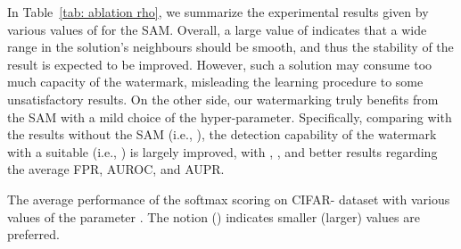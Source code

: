 \documentclass{article}
\begin{document}
In Table~\ref{tab: ablation rho}, we summarize the experimental results given by various values of  for the SAM. Overall, a large value of  indicates that a wide range in the solution's neighbours should be smooth, and thus the stability of the result is expected to be improved. However, such a solution may consume too much capacity of the watermark, misleading the learning procedure to some unsatisfactory results. On the other side, our watermarking truly benefits from the SAM with a mild choice of the hyper-parameter. {Specifically, comparing with the results without the SAM (i.e., ), the detection capability of the watermark with a suitable  (i.e., ) is largely improved, with , , and  better results regarding the average FPR, AUROC, and AUPR. }


\begin{table}[t]
\centering
\parbox{.47\linewidth}{
\centering
\scriptsize
\caption{The average performance of the softmax scoring on CIFAR- dataset with various values of the parameter .  The notion  () indicates smaller (larger) values are preferred.} \label{tab: ablation sigma}
}~~~~~
\parbox{.47\linewidth}{
\centering
\caption{{The average performance of the softmax scoring on CIFAR-10 dataset with various values of the parameter .  The notion  () indicates smaller (larger) values are preferred.}} \label{tab: ablation rho}
\scriptsize
\resizebox{.4\columnwidth}{!}{
}}
\end{table}
\end{document}
